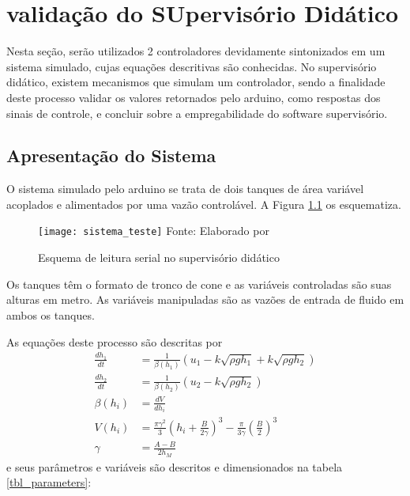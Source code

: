 \chapter{validação do SUpervisório Didático}

Nesta seção, serão utilizados 2 controladores devidamente sintonizados em um sistema simulado, cujas equações descritivas são conhecidas. No supervisório didático, existem mecanismos que simulam um controlador, sendo a finalidade deste processo validar os valores retornados pelo arduino, como respostas dos sinais de controle, e concluir sobre a empregabilidade do software supervisório.

\section{Apresentação do Sistema}

O sistema simulado pelo arduino se trata de dois tanques de área variável acoplados e alimentados por uma vazão controlável. A Figura \ref{img_sistema_teste} os esquematiza.

\begin{figure}[htb]
	\centering
	\caption{Esquema de leitura serial no supervisório didático}
	\texttt{[image: sistema\_teste]}
	Fonte: Elaborado por 
	\label{img_sistema_teste}
\end{figure}

Os tanques têm o formato de tronco de cone e as variáveis controladas são suas alturas em metro. As variáveis manipuladas são as vazões de entrada de fluido em ambos os tanques.

As equações deste processo são descritas por
\begin{align}
\frac{dh_1}{dt} &= \frac{1}{\beta(h_1)}(u_1 - k\sqrt{\rho g h_1} + k\sqrt{\rho g h_2}) \\
\frac{dh_2}{dt} &= \frac{1}{\beta(h_2)}(u_2 - k\sqrt{\rho g h_2}) \\
\beta(h_i) &= \frac{dV}{dh_i} \\
V(h_i) &= \frac{\pi\gamma^2}{3}(h_i + \frac{B}{2\gamma})^3 - \frac{\pi}{3\gamma}(\frac{B}{2})^3 \\
\gamma &= \frac{A-B}{2h_M}
\label{eq_descritivas}
\end{align}
e seus parâmetros e variáveis são descritos e dimensionados na tabela \ref{tbl_parameters}:


